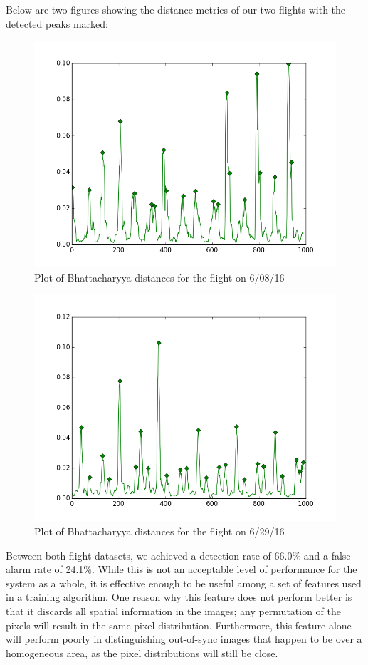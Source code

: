 Below are two figures showing the distance metrics of our two flights with the detected peaks marked:

\begin{figure}[h]
\centering
\includegraphics[scale=.50]{figures/608pf}
\caption{Plot of Bhattacharyya distances for the flight on 6/08/16}
\label{fig:tamu-fig1}
\end{figure}

\begin{figure}[h]
\centering
\includegraphics[scale=.50]{figures/629pf}
\caption{Plot of Bhattacharyya distances for the flight on 6/29/16}
\label{fig:tamu-fig2}
\end{figure}

Between both flight datasets, we achieved a detection rate of 66.0\% and a false alarm rate of 24.1\%.
While this is not an acceptable level of performance for the system as a whole, it is effective enough to be useful among a set of features used in a training algorithm.
One reason why this feature does not perform better is that it discards all spatial information in the images; any permutation of the pixels will result in the same pixel distribution.
Furthermore, this feature alone will perform poorly in distinguishing out-of-sync images that happen to be over a homogeneous area, as the pixel distributions will still be close.


